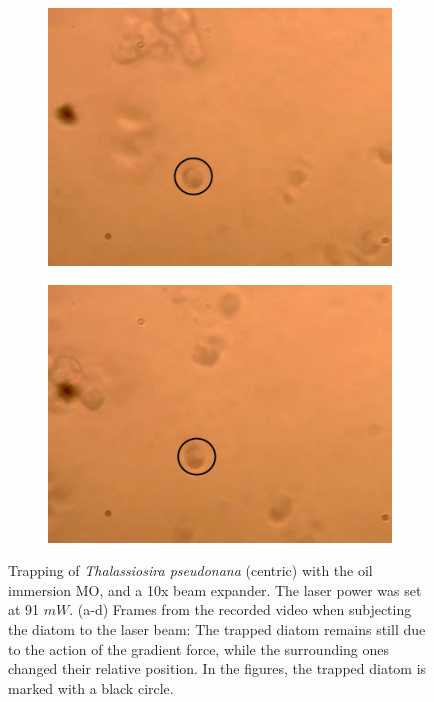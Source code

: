 \documentclass[letterpaper,12pt,oneside]{book}
\begin{document}
\begin{figure}[H]
\begin{subfigure}[b]{0.5\linewidth}
    \centering
    \includegraphics[scale=0.3]{Results/ResultsOilpseudonana/op3.png} 
    \caption{}
    \label{fig7:c} 
  \end{subfigure}%
  \begin{subfigure}[b]{0.5\linewidth}
    \centering
    \includegraphics[scale=0.3]{Results/ResultsOilpseudonana/op4.png} 
    \caption{}
    \label{fig7:d} 
  \end{subfigure} 
  \caption{Trapping of \textit{Thalassiosira pseudonana} (centric) with the oil immersion MO, and a 10x beam expander. The laser power was set at 91 $mW$. (a-d) Frames from
the recorded video when subjecting the diatom to the laser beam: The trapped diatom remains still due to the action of the gradient force, while the surrounding ones changed their relative position. In the figures, the trapped diatom is
marked with a black circle. }
  \label{} 
\end{figure}
\end{document}
